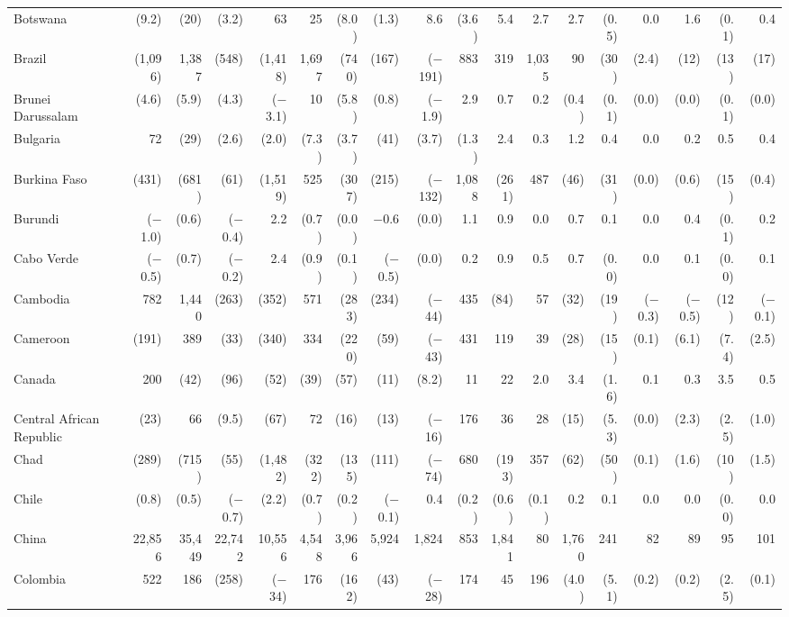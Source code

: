 \begin{longtable}{lrrrrrrrrrrrrrrrrr}
Botswana & (9.2) & (20) & (3.2) & 63 & 25 & (8.0) & (1.3) & 8.6 & (3.6) & 5.4 & 2.7 & 2.7 & (0.5) & 0.0 & 1.6 & (0.1) & 0.4 \\
Brazil & (1,096) & 1,387 & (548) & (1,418) & 1,697 & (740) & (167) & ($-$191) & 883 & 319 & 1,035 & 90 & (30) & (2.4) & (12) & (13) & (17) \\
Brunei Darussalam & (4.6) & (5.9) & (4.3) & ($-$3.1) & 10 & (5.8) & (0.8) & ($-$1.9) & 2.9 & 0.7 & 0.2 & (0.4) & (0.1) & (0.0) & (0.0) & (0.1) & (0.0) \\
Bulgaria & 72 & (29) & (2.6) & (2.0) & (7.3) & (3.7) & (41) & (3.7) & (1.3) & 2.4 & 0.3 & 1.2 & 0.4 & 0.0 & 0.2 & 0.5 & 0.4 \\
Burkina Faso & (431) & (681) & (61) & (1,519) & 525 & (307) & (215) & ($-$132) & 1,088 & (261) & 487 & (46) & (31) & (0.0) & (0.6) & (15) & (0.4) \\
Burundi & ($-$1.0) & (0.6) & ($-$0.4) & 2.2 & (0.7) & (0.0) & $-$0.6 & (0.0) & 1.1 & 0.9 & 0.0 & 0.7 & 0.1 & 0.0 & 0.4 & (0.1) & 0.2 \\
Cabo Verde & ($-$0.5) & (0.7) & ($-$0.2) & 2.4 & (0.9) & (0.1) & ($-$0.5) & (0.0) & 0.2 & 0.9 & 0.5 & 0.7 & (0.0) & 0.0 & 0.1 & (0.0) & 0.1 \\
Cambodia & 782 & 1,440 & (263) & (352) & 571 & (283) & (234) & ($-$44) & 435 & (84) & 57 & (32) & (19) & ($-$0.3) & ($-$0.5) & (12) & ($-$0.1) \\
Cameroon & (191) & 389 & (33) & (340) & 334 & (220) & (59) & ($-$43) & 431 & 119 & 39 & (28) & (15) & (0.1) & (6.1) & (7.4) & (2.5) \\
Canada & 200 & (42) & (96) & (52) & (39) & (57) & (11) & (8.2) & 11 & 22 & 2.0 & 3.4 & (1.6) & 0.1 & 0.3 & 3.5 & 0.5 \\
Central African Republic & (23) & 66 & (9.5) & (67) & 72 & (16) & (13) & ($-$16) & 176 & 36 & 28 & (15) & (5.3) & (0.0) & (2.3) & (2.5) & (1.0) \\
Chad & (289) & (715) & (55) & (1,482) & (322) & (135) & (111) & ($-$74) & 680 & (193) & 357 & (62) & (50) & (0.1) & (1.6) & (10) & (1.5) \\
Chile & (0.8) & (0.5) & ($-$0.7) & (2.2) & (0.7) & (0.2) & ($-$0.1) & 0.4 & (0.2) & (0.6) & (0.1) & 0.2 & 0.1 & 0.0 & 0.0 & (0.0) & 0.0 \\
China & 22,856 & 35,449 & 22,742 & 10,556 & 4,548 & 3,966 & 5,924 & 1,824 & 853 & 1,841 & 80 & 1,760 & 241 & 82 & 89 & 95 & 101 \\
Colombia & 522 & 186 & (258) & ($-$34) & 176 & (162) & (43) & ($-$28) & 174 & 45 & 196 & (4.0) & (5.1) & (0.2) & (0.2) & (2.5) & (0.1) \\

\end{longtable}
